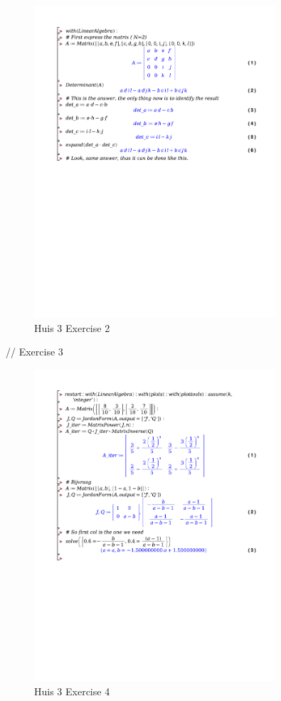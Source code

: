 \documentclass[a4paper]{report}
\begin{document}
\begin{figure}[H]
	\centering
	\includegraphics[width=0.8\textwidth]{exercises/huis_3_ex_2.pdf}
	\caption{Huis 3 Exercise 2}
	\label{fig:huis_3_ex_2_Maple}
\end{figure}

// Exercise 3


\begin{figure}[H]
	\centering
	\includegraphics[width=0.8\textwidth]{exercises/huis_3_ex_4.pdf}
	\caption{Huis 3 Exercise 4}
	\label{fig:huis_3_ex_4_Maple}
\end{figure}
\end{document}
